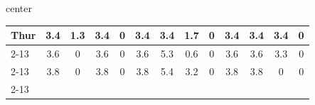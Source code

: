 \documentclass{article}
\begin{document}
\begin{adjustbox}{center}
\begin{tabular}{lcccccccccccc}
\multicolumn{1}{l|}{{ Thur}}                                      & \multicolumn{1}{c|}{{ 3.4}}                                  & \multicolumn{1}{c|}{{ 1.3}}                                   & \multicolumn{1}{c|}{{ 3.4}}                                  & \multicolumn{1}{c|}{{ 0}}                                     & \multicolumn{1}{c|}{{ 3.4}}                                  & \multicolumn{1}{c|}{{ 3.4}}                                   & \multicolumn{1}{c|}{{ 1.7}}                                  & \multicolumn{1}{c|}{{ 0}}                                     & \multicolumn{1}{c|}{{ 3.4}}                                  & \multicolumn{1}{c|}{{ 3.4}}                                   & \multicolumn{1}{c|}{{ 3.4}}                                  & \multicolumn{1}{c|}{{ 0}}                                     \\ \cline{2-13} 
\multicolumn{1}{l|}{{ Fri}}                                       & \multicolumn{1}{c|}{{ 3.6}}                                  & \multicolumn{1}{c|}{{ 0}}                                     & \multicolumn{1}{c|}{{ 3.6}}                                  & \multicolumn{1}{c|}{{ 0}}                                     & \multicolumn{1}{c|}{{ 3.6}}                                  & \multicolumn{1}{c|}{{ 5.3}}                                   & \multicolumn{1}{c|}{{ 0.6}}                                  & \multicolumn{1}{c|}{{ 0}}                                     & \multicolumn{1}{c|}{{ 3.6}}                                  & \multicolumn{1}{c|}{{ 3.6}}                                   & \multicolumn{1}{c|}{{ 3.3}}                                  & \multicolumn{1}{c|}{{ 0}}                                     \\ \cline{2-13} 
\multicolumn{1}{l|}{{ Sat}}                                       & \multicolumn{1}{c|}{{ 3.8}}                                  & \multicolumn{1}{c|}{{ 0}}                                     & \multicolumn{1}{c|}{{ 3.8}}                                  & \multicolumn{1}{c|}{{ 0}}                                     & \multicolumn{1}{c|}{{ 3.8}}                                  & \multicolumn{1}{c|}{{ 5.4}}                                   & \multicolumn{1}{c|}{{ 3.2}}                                  & \multicolumn{1}{c|}{{ 0}}                                     & \multicolumn{1}{c|}{{ 3.8}}                                  & \multicolumn{1}{c|}{{ 3.8}}                                   & \multicolumn{1}{c|}{{ 0}}                                    & \multicolumn{1}{c|}{{ 0}}                                     \\ \cline{2-13} 

\end{tabular}
\end{adjustbox}
\end{document}
